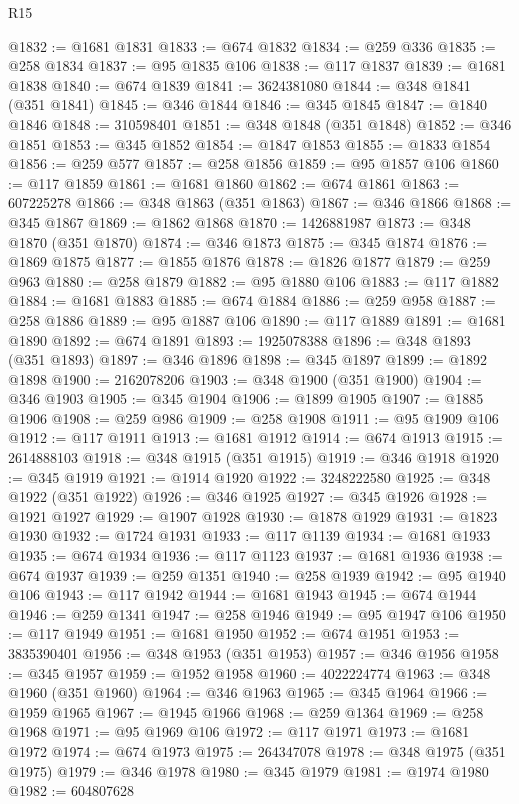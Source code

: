 \begin{lexlean}{R15}
\begin{coremodule}
@1832 := @1681 @1831
@1833 := @674 @1832
@1834 := @259 @336
@1835 := @258 @1834
@1837 := @95 @1835 @106
@1838 := @117 @1837
@1839 := @1681 @1838
@1840 := @674 @1839
@1841 := 3624381080
@1844 := @348 @1841 (@351 @1841)
@1845 := @346 @1844
@1846 := @345 @1845
@1847 := @1840 @1846
@1848 := 310598401
@1851 := @348 @1848 (@351 @1848)
@1852 := @346 @1851
@1853 := @345 @1852
@1854 := @1847 @1853
@1855 := @1833 @1854
@1856 := @259 @577
@1857 := @258 @1856
@1859 := @95 @1857 @106
@1860 := @117 @1859
@1861 := @1681 @1860
@1862 := @674 @1861
@1863 := 607225278
@1866 := @348 @1863 (@351 @1863)
@1867 := @346 @1866
@1868 := @345 @1867
@1869 := @1862 @1868
@1870 := 1426881987
@1873 := @348 @1870 (@351 @1870)
@1874 := @346 @1873
@1875 := @345 @1874
@1876 := @1869 @1875
@1877 := @1855 @1876
@1878 := @1826 @1877
@1879 := @259 @963
@1880 := @258 @1879
@1882 := @95 @1880 @106
@1883 := @117 @1882
@1884 := @1681 @1883
@1885 := @674 @1884
@1886 := @259 @958
@1887 := @258 @1886
@1889 := @95 @1887 @106
@1890 := @117 @1889
@1891 := @1681 @1890
@1892 := @674 @1891
@1893 := 1925078388
@1896 := @348 @1893 (@351 @1893)
@1897 := @346 @1896
@1898 := @345 @1897
@1899 := @1892 @1898
@1900 := 2162078206
@1903 := @348 @1900 (@351 @1900)
@1904 := @346 @1903
@1905 := @345 @1904
@1906 := @1899 @1905
@1907 := @1885 @1906
@1908 := @259 @986
@1909 := @258 @1908
@1911 := @95 @1909 @106
@1912 := @117 @1911
@1913 := @1681 @1912
@1914 := @674 @1913
@1915 := 2614888103
@1918 := @348 @1915 (@351 @1915)
@1919 := @346 @1918
@1920 := @345 @1919
@1921 := @1914 @1920
@1922 := 3248222580
@1925 := @348 @1922 (@351 @1922)
@1926 := @346 @1925
@1927 := @345 @1926
@1928 := @1921 @1927
@1929 := @1907 @1928
@1930 := @1878 @1929
@1931 := @1823 @1930
@1932 := @1724 @1931
@1933 := @117 @1139
@1934 := @1681 @1933
@1935 := @674 @1934
@1936 := @117 @1123
@1937 := @1681 @1936
@1938 := @674 @1937
@1939 := @259 @1351
@1940 := @258 @1939
@1942 := @95 @1940 @106
@1943 := @117 @1942
@1944 := @1681 @1943
@1945 := @674 @1944
@1946 := @259 @1341
@1947 := @258 @1946
@1949 := @95 @1947 @106
@1950 := @117 @1949
@1951 := @1681 @1950
@1952 := @674 @1951
@1953 := 3835390401
@1956 := @348 @1953 (@351 @1953)
@1957 := @346 @1956
@1958 := @345 @1957
@1959 := @1952 @1958
@1960 := 4022224774
@1963 := @348 @1960 (@351 @1960)
@1964 := @346 @1963
@1965 := @345 @1964
@1966 := @1959 @1965
@1967 := @1945 @1966
@1968 := @259 @1364
@1969 := @258 @1968
@1971 := @95 @1969 @106
@1972 := @117 @1971
@1973 := @1681 @1972
@1974 := @674 @1973
@1975 := 264347078
@1978 := @348 @1975 (@351 @1975)
@1979 := @346 @1978
@1980 := @345 @1979
@1981 := @1974 @1980
@1982 := 604807628

\end{coremodule}
\end{lexlean}
